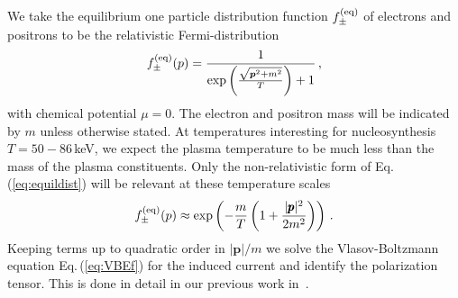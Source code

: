 
We take the equilibrium one particle distribution function $f_\pm^{(\mathrm{eq})}$ of electrons and positrons to be the relativistic Fermi-distribution
\begin{equation}\label{eq:equildist}
f^{(\mathrm{eq})}_\pm(p) = \frac{1}{\exp{\left(\frac{\sqrt{\boldsymbol{p}^2 + m^2}}{T}\right)}
+1}\,,
\end{equation}
with chemical potential $\mu = 0 $. The electron and positron mass will be indicated by $m$ unless otherwise stated. At temperatures interesting for nucleosynthesis $T = 50-86$\,keV, we expect the plasma temperature to be much less than the mass of the plasma constituents. Only the non-relativistic form of Eq.\,(\ref{eq:equildist}) will be relevant at these temperature scales
\begin{equation}
f^{(\mathrm{eq})}_\pm(p) \approx \exp\left(- \frac{m}{T}\left(1+\frac{|\pmb{p}|^2}{2m^2}\right)\right)\,.
\end{equation}
Keeping terms up to quadratic order in $|\boldsymbol{p}|/m$ we solve the Vlasov-Boltzmann equation Eq.\,(\ref{eq:VBEf}) for the induced current and identify the polarization tensor. This is done in detail in our previous work in~\cite{Formanek:2021blc}.

